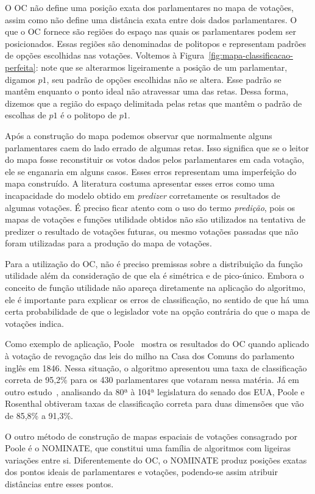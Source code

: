 \documentclass[
	article,			%
	12pt,				%
	oneside,			%
	a4paper,			%
	english,			%
	brazil,				%
	sumario=tradicional,
	oldfontcommands %
	]{abntex2}
\newcommand\nominate{NOMINATE\xspace}
\begin{document}
O OC não define uma posição exata dos parlamentares no mapa de votações, assim como não define uma distância exata entre dois dados parlamentares. O que o OC fornece são regiões do espaço nas quais os parlamentares podem ser posicionados. Essas regiões são denominadas de politopos e representam padrões de opções escolhidas nas votações. Voltemos à Figura~\ref{fig:mapa-classificacao-perfeita}: note que se alterarmos ligeiramente a posição de um parlamentar, digamos $p1$, seu padrão de opções escolhidas não se altera. Esse padrão se mantêm enquanto o ponto ideal não atravessar uma das retas. Dessa forma, dizemos que a região do espaço delimitada pelas retas que mantêm o padrão de escolhas de $p1$ é o politopo de $p1$.

Após a construção do mapa podemos observar que normalmente alguns parlamentares caem do lado errado de algumas retas. Isso significa que se o leitor do mapa fosse reconstituir os votos dados pelos parlamentares em cada votação, ele se enganaria em alguns casos. Esses erros representam uma imperfeição do mapa construído. A literatura costuma apresentar esses erros como uma incapacidade do modelo obtido em \emph{predizer} corretamente os resultados de algumas votações. É preciso ficar atento com o uso do termo \emph{predição}, pois os mapas de votações e funções utilidade obtidos não são utilizados na tentativa de predizer o resultado de votações futuras, ou mesmo votações passadas que não foram utilizadas para a produção do mapa de votações. 

Para a utilização do OC, não é preciso premissas sobre a distribuição da função utilidade além da consideração de que ela é simétrica e de pico-único. Embora o conceito de função utilidade não apareça diretamente na aplicação do algoritmo, ele é importante para explicar os erros de classificação, no sentido de que há uma certa probabilidade de que o legislador vote na opção contrária do que o mapa de votações indica.

Como exemplo de aplicação, Poole~\cite{poole2005book} mostra os resultados do OC quando aplicado à votação de revogação das leis do milho na Casa dos Comuns do parlamento inglês em 1846. Nessa situação, o algoritmo apresentou uma taxa de classificação correta de 95,2\% para os 430 parlamentares que votaram nessa matéria. Já em outro estudo~\cite{poole-rosenthal2000}, analisando da 80ª à 104ª legislatura do senado dos EUA, Poole e Rosenthal obtiveram taxas de classificação correta para duas dimensões que vão de 85,8\% a 91,3\%.

O outro método de construção de mapas espaciais de votações consagrado por Poole é o \nominate, que constitui uma família de algoritmos com ligeiras variações entre si. Diferentemente do OC, o \nominate produz posições exatas dos pontos ideais de parlamentares e votações, podendo-se assim atribuir distâncias entre esses pontos. 
\end{document}
